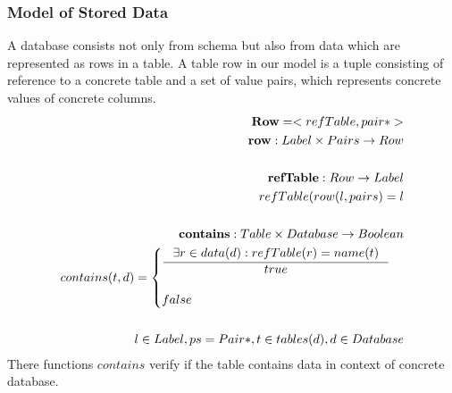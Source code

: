 \documentclass[11pt]{article}
\begin{document}

\subsubsection{Model of Stored Data}
A database consists not only from schema but also from data which are represented as rows in a table. A table row in our model is a tuple consisting of reference to a concrete table and a set of value pairs, which represents concrete values of concrete columns.
\begin{align*}
	\mathbf{Row} = < refTable, pair* > \\
	\mathbf{row} : Label \times Pairs \rightarrow Row \\ \\
	\mathbf{refTable} : Row \rightarrow Label \\
	refTable(row(l, pairs) = l \\ \\
	\mathbf{contains} : Table \times Database \rightarrow Boolean \\
	contains(t, d) = \begin{cases}
			\inference{\exists r \in data(d) : refTable(r) = name(t) }{true} \\ \\
		 	false
 		\end{cases} \\ \\
 l \in Label, ps = Pair*, t \in tables(d), d \in Database
\end{align*}
There functions $contains$ verify if the table contains data in context of concrete database.
\end{document}
